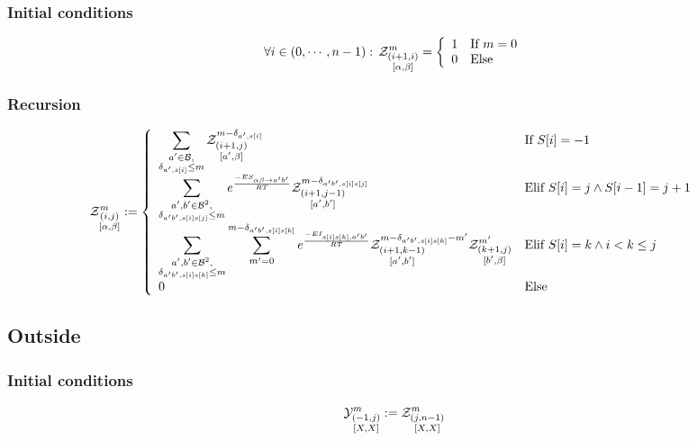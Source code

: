 \subsubsection{Initial conditions}
$$
	\forall i \in (0,\cdots,n-1):\, \Z{i+1,i}{m}{\alpha,\beta}=\left\{
	\begin{array}{ll}
		1 &\text{If } m = 0\\
		0 &\text{Else }
	\end{array}\right.
$$
\subsubsection{Recursion}
$$
	\Z{i,j}{m}{\alpha,\beta}:=\left\{
  \begin{array}{ll}
  		\displaystyle
      \sum_{\substack{a'\in \B,\\ \Kron_{a',s[i]}\le m}}  
      \Z{i+1,j}{m-\Kron_{a',s[i]}}{a',\beta} & \text{If }S{[i]}=-1\\
      \displaystyle
      \sum_{\substack{a',b'\in \B^2,\\ \Kron_{a'b',s[i]s[j]}\le m}}  
			 e^{\frac{-ES_{\alpha \beta \to a' b'}}{RT}}
			 \Z{i+1,j-1}{m-\Kron_{a'b',s[i]s[j]}}{a',b'}&
			 \text{Elif }S{[i]}=j \land S{[i-1]}=j+1\\
			 \displaystyle
      \sum_{\substack{a',b'\in \B^2,\\ \Kron_{a'b',s[i]s[k]}\le m}}
      \sum_{m'=0}^{m-\Kron_{a'b',s[i]s[k]}}
   		 e^{\frac{-EI_{s[i]s[k],a'b'}}{RT}}
      \Z{i+1,k-1}{m-\Kron_{a'b',s[i]s[k]}-m'}{a',b'}
      \Z{k+1,j}{m'}{b',\beta} & \text{Elif }S[i]=k \land i < k \leq j\\
      0 &\text{Else}
	\end{array}\right.
$$

\subsection{Outside}	
\subsubsection{Initial conditions}
$$
	\Y{-1,j}{m}{X,X}:=
		\displaystyle
	  \Z{j,n-1}{m}{X,X}
$$
